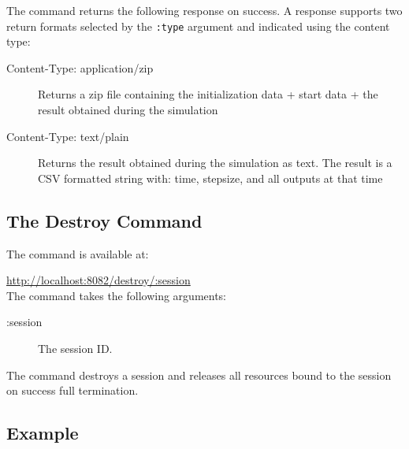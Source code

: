 	\noindent The command returns the following response on success.
	A response supports two return formats selected by the \texttt{:type} argument and indicated using the content type:
	\begin{description}
		\item[Content-Type: application/zip] Returns a zip file containing the initialization data + start data + the result obtained during the simulation
		\item[Content-Type: text/plain] Returns the result obtained during the simulation as text. The result is a CSV formatted string with: time, stepsize, and all outputs at that time
	\end{description}
	\subsection{The Destroy Command}
	The command is available at:
	
	\url{http://localhost:8082/destroy/:session}\\
	
	\noindent The command takes the following arguments:
	
	\begin{description}
		\item[:session] The session ID.
	\end{description}
	
	\noindent The command destroys a session and releases all resources bound to the session on success full termination.
%
%
	
	\subsection{Example}\label{subsec:example}
	
